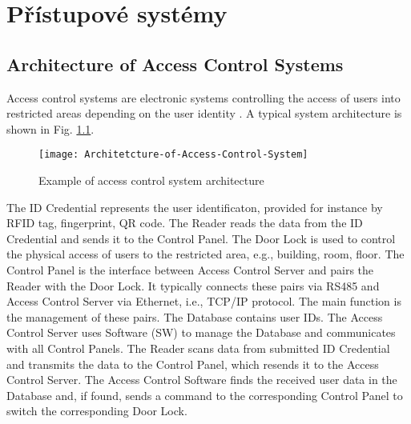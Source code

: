 \chapter{Přístupové systémy}

\section{Architecture of Access Control Systems}
Access control systems are electronic systems controlling the access of users into restricted areas depending on the user identity \cite{accessControlSystem_eiprocus}. A typical system architecture is shown in Fig. \ref{fig:Access control system architecture}.

\begin{figure}[!h]
    \centering
    \texttt{[image: Architetcture-of-Access-Control-System]}
    \caption{Example of access control system architecture \cite{accessControlSystem_eiprocus}}
    \label{fig:Access control system architecture}
\end{figure}

The ID Credential represents the user identificaton, provided for instance by RFID tag, fingerprint, QR code.
The Reader reads the data from the ID Credential and sends it to the Control Panel.
The Door Lock is used to control the physical access of users to the restricted area, e.g., building, room, floor.
The Control Panel is the interface between Access Control Server and pairs the Reader with the Door Lock. It typically connects these pairs via RS485 and Access Control Server via Ethernet, i.e., TCP/IP protocol. The main function is the management of these pairs.
The Database contains user IDs.
The Access Control Server uses Software (SW) to manage the Database and communicates with all Control Panels.
The Reader scans data from submitted ID Credential and transmits the data to the Control Panel, which resends it to the Access Control Server.
The Access Control Software finds the received user data in the Database and, if found, sends a command to the corresponding Control Panel to switch the corresponding Door Lock.
